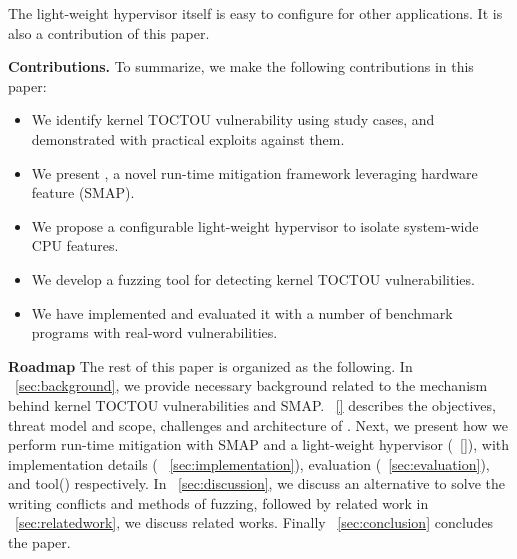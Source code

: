The light-weight hypervisor itself is easy to configure for other applications. It is also a contribution of this paper.



\textbf{Contributions.} To summarize, we make the following contributions in this paper:
\begin{itemize}[leftmargin=*]
    \item We identify kernel TOCTOU vulnerability using study cases, and demonstrated with practical exploits against them. 
    \item We present \name, a novel run-time mitigation framework leveraging hardware feature (SMAP). 
    \item We propose a configurable light-weight hypervisor to isolate system-wide CPU features.
    \item We develop a fuzzing tool for detecting kernel TOCTOU vulnerabilities.
    \item We have implemented \name and evaluated it with a number of benchmark programs with real-word vulnerabilities.
  
\end{itemize}


\textbf{Roadmap}
The rest of this paper is organized as the following. 
In ~\autoref{sec:background}, we provide necessary background related to the mechanism behind kernel TOCTOU vulnerabilities and SMAP. ~\autoref{} describes the objectives, threat model and scope, challenges and architecture of \name. Next, we present how we perform run-time mitigation with SMAP and a light-weight hypervisor (~\autoref{}),  with implementation details ( ~\autoref{sec:implementation}), evaluation (~\autoref{sec:evaluation}), and tool() respectively.  In ~\autoref{sec:discussion},  we discuss an alternative to solve the writing conflicts and methods of fuzzing, followed by related work in ~\autoref{sec:relatedwork}, we discuss related works. Finally ~\autoref{sec:conclusion} concludes the paper.
